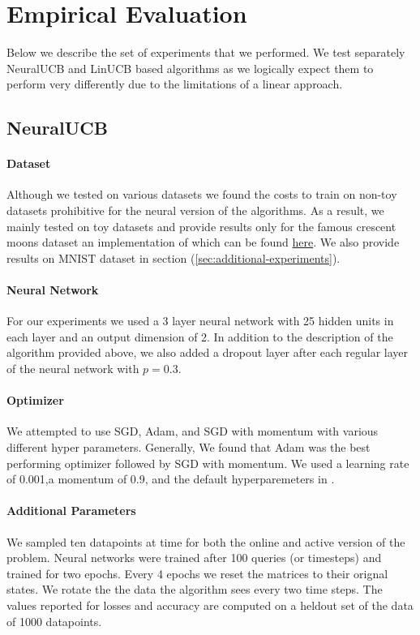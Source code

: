 \documentclass{article}
\begin{document}
\section{Empirical Evaluation}
Below we describe the set of experiments that we performed.
We test separately NeuralUCB and LinUCB based algorithms as we logically expect them to perform
very differently due to the limitations of a linear approach.



\subsection{NeuralUCB}
\paragraph{Dataset}
Although we tested on various datasets we found the costs to train on non-toy datasets prohibitive for the neural version of the algorithms.
As a result, we mainly tested on toy datasets and provide results only for the famous crescent moons dataset an implementation of which can
be found
\href{https://scikit-learn.org/stable/modules/generated/sklearn.datasets.make_moons.html}{here}.
We also provide results on MNIST dataset in section (\ref{sec:additional-experiments}).

\paragraph{Neural Network}
For our experiments we used a 3 layer neural network with 25 hidden units in each layer and an output dimension of 2.
In addition to the description of the algorithm provided above, we also added a dropout layer after each regular layer of the neural network with
$p =0.3$.

\paragraph{Optimizer}
We attempted to use SGD, Adam, and SGD with momentum with various different hyper parameters.
Generally, We found that Adam was the best performing optimizer followed by SGD with momentum.
We used a learning rate of 0.001,a momentum of 0.9, and the default hyperparemeters in \cite{adam}.

\paragraph{Additional Parameters}
We sampled ten datapoints at time for both the online and active version of the problem. Neural networks were trained after 100 queries (or timesteps)
and trained for two epochs. Every 4 epochs we reset the matrices to their orignal states. We rotate the the data the algorithm sees every two time steps.
The values reported for losses and accuracy are computed on a heldout set of the data of 1000 datapoints.
\end{document}

